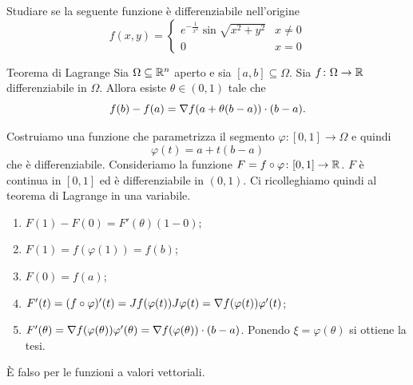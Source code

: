 \documentclass[a4paper]{article}
\begin{document}
\begin{radioactive}
\begin{snippetexercise}{}
    Studiare se la seguente funzione è differenziabile nell'origine
    \[
        f(x,y) = \begin{cases}
            e^{-\frac{1}{x^2}} \sin \sqrt{x^2 + y^2} & x \neq 0 \\
            0 & x = 0
        \end{cases}
    \]
\end{snippetexercise}

\begin{snippettheorem}{Teorema di Lagrange}
    Sia \(\Omega \subseteq \mathbb{R}^n\) aperto e sia \([a,b]\subseteq \Omega\).
    Sia \(f\colon \Omega \to \mathbb{R}\) differenziabile in \(\Omega\).
    Allora esiste \(\theta \in (0,1)\) tale che
    \[
        f(b)-f(a) = \nabla f(a+\theta(b-a)) \cdot (b-a).
    \]
\end{snippettheorem}
\end{radioactive}

\begin{radioactive}
\begin{snippetproof}{}
    Costruiamo una funzione che parametrizza il segmento
    \(\varphi \colon [0,1] \to \Omega\) e quindi
    \[
        \varphi(t) = a+t(b-a)
    \]
    che è differenziabile. Consideriamo la funzione \(F = f \circ \varphi \colon [0,1] \to \mathbb{R}\).
    \(F\) è continua in \([0,1]\) ed è differenziabile in \((0,1)\).
    Ci ricolleghiamo quindi al teorema di Lagrange in una variabile.
    \begin{enumerate}
        \item \(F(1) - F(0) = F'(\theta)(1-0)\);
        \item \(F(1) = f(\varphi(1)) = f(b)\);
        \item \(F(0) = f(a)\);
        \item \(F'(t) = (f\circ \varphi)'(t) = J f(\varphi(t)) J \varphi(t) = \nabla f(\varphi(t)) \varphi'(t)\);
        \item \(F'(\theta) = \nabla f(\varphi(\theta))\varphi'(\theta) = \nabla f(\varphi(\theta)) \cdot (b-a)\). Ponendo \(\xi = \varphi(\theta)\) si ottiene la tesi.
    \end{enumerate}
\end{snippetproof}

È falso per le funzioni a valori vettoriali.
\end{radioactive}
\end{document}
